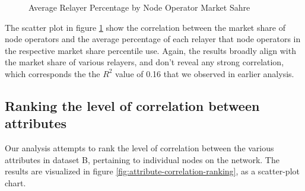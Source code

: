 \documentclass[conference]{IEEEtran}
\begin{document}
\begin{figure}[htbp]
  \centering
  \caption{Average Relayer Percentage by Node Operator Market Sahre}
  \label{fig:average_relayer_percentage_by_percentile}
\end{figure}

The scatter plot in figure \ref{fig:average_relayer_percentage_by_percentile} show the correlation between the market share of node operators and the average percentage of each relayer that node operators in the respective market share percentile use.
Again, the results broadly align with the market share of various relayers, and don't reveal any strong correlation, which corresponds the the $R^2$ value of 0.16 that we observed in earlier analysis.

\subsection{Ranking the level of correlation between attributes}

Our analysis attempts to rank the level of correlation between the various attributes in dataset B, pertaining to individual nodes on the network.  The results are visualized in figure \ref{fig:attribute-correlation-ranking}, as a scatter-plot chart.
\end{document}
